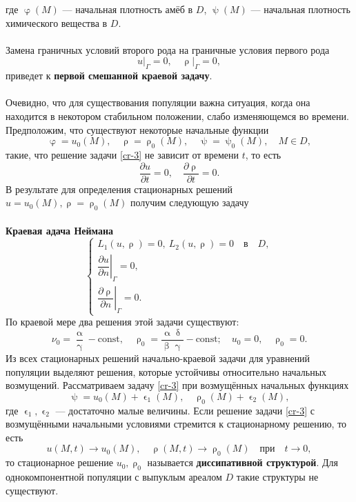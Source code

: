 \documentclass[a4paper, 12pt]{report}
\numberwithin{equation}{section}
\renewcommand{\alpha}{\upalpha}
\renewcommand{\beta}{\upbeta}
\renewcommand{\gamma}{\upgamma}
\renewcommand{\delta}{\updelta}
\renewcommand{\varphi}{\upvarphi}
\renewcommand{\psi}{\uppsi}
\renewcommand{\epsilon}{\upvarepsilon}
\renewcommand{\rho}{\uprho}
\begin{document}
где \( \varphi(M) \) --- начальная плотность амёб в \(D\), \( \psi(M) \) --- начальная плотность химического вещества в \(D\).
\\\\
Замена граничных условий второго рода на граничные условия первого рода
\[
u\big|_{\Gamma} = 0,\quad \rho\big|_{\Gamma} = 0,
\]
приведет к \textbf{первой смешанной краевой задачу}.
\\\\
Очевидно, что для существования популяции важна ситуация, когда она находится в некотором стабильном положении, слабо изменяющемся во времени. Предположим, что существуют некоторые начальные функции
\[
\varphi = u_0(M), \quad \rho = \rho_0(M), \quad \psi = \psi_0(M), \quad M \in D,
\]
такие, что решение задачи \eqref{cr-3} не зависит от времени \(t\), то есть
\[
\frac{\partial u}{\partial t} = 0, \quad \frac{\partial \rho}{\partial t} = 0.
\]
В результате для определения стационарных решений \(u = u_0(M), \rho = \rho_0(M)\) получим следующую задачу\\\\
\textbf{Краевая адача Неймана}
\begin{equation}
    \begin{cases}
        L_1(u, \rho) = 0,\ L_2(u, \rho) = 0 \quad \text{в} \quad D,\\
        \left. \dfrac{\partial u}{\partial n} \right|_{\Gamma} = 0, \\ 
        \left. \dfrac{\partial \rho}{\partial n} \right|_{\Gamma} = 0.
    \end{cases}
\end{equation}
По краевой мере два решения этой задачи существуют:
\begin{equation}
\nu_0 = \dfrac{\alpha}{\gamma} - \text{const}, \quad 
\rho_0 = \dfrac{\alpha \delta}{\beta \gamma} - \text{const}; \quad 
u_0 = 0, \quad \rho_0 = 0.
\end{equation}
Из всех стационарных решений начально-краевой задачи для уравнений популяции выделяют решения, которые устойчивы относительно начальных возмущений.
Рассматриваем задачу \eqref{cr-3} при возмущённых начальных функциях 
\[
\psi = u_0(M) + \epsilon_1(M), \quad 
\rho_0(M) + \epsilon_2(M),
\]
где \(\epsilon_1, \epsilon_2\) --- достаточно малые величины. Если решение задачи \eqref{cr-3} с возмущёнными начальными условиями стремится к стационарному решению, то есть
\[
u(M, t) \rightarrow u_0(M), \quad 
\rho(M, t) \rightarrow \rho_0(M) \quad \text{при} \quad t \rightarrow 0,
\]
то стационарное решение \(u_0, \rho_0\) называется \textbf{диссипативной структурой}. Для однокомпонентной популяции с выпуклым ареалом \(D\) такие структуры не существуют.
\end{document}
